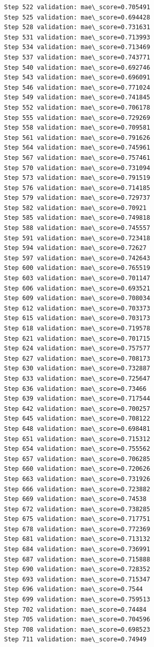\documentclass[11pt]{article}
\begin{document}
\begin{Verbatim}[commandchars=\\\{\}]
Step 522 validation: mae\_score=0.705491
Step 525 validation: mae\_score=0.694428
Step 528 validation: mae\_score=0.731631
Step 531 validation: mae\_score=0.713993
Step 534 validation: mae\_score=0.713469
Step 537 validation: mae\_score=0.743771
Step 540 validation: mae\_score=0.692746
Step 543 validation: mae\_score=0.696091
Step 546 validation: mae\_score=0.771024
Step 549 validation: mae\_score=0.741845
Step 552 validation: mae\_score=0.706178
Step 555 validation: mae\_score=0.729269
Step 558 validation: mae\_score=0.709581
Step 561 validation: mae\_score=0.791626
Step 564 validation: mae\_score=0.745961
Step 567 validation: mae\_score=0.757461
Step 570 validation: mae\_score=0.731094
Step 573 validation: mae\_score=0.791519
Step 576 validation: mae\_score=0.714185
Step 579 validation: mae\_score=0.729737
Step 582 validation: mae\_score=0.70921
Step 585 validation: mae\_score=0.749818
Step 588 validation: mae\_score=0.745557
Step 591 validation: mae\_score=0.723418
Step 594 validation: mae\_score=0.72627
Step 597 validation: mae\_score=0.742643
Step 600 validation: mae\_score=0.765519
Step 603 validation: mae\_score=0.701147
Step 606 validation: mae\_score=0.693521
Step 609 validation: mae\_score=0.708034
Step 612 validation: mae\_score=0.703373
Step 615 validation: mae\_score=0.703173
Step 618 validation: mae\_score=0.719578
Step 621 validation: mae\_score=0.701715
Step 624 validation: mae\_score=0.757577
Step 627 validation: mae\_score=0.708173
Step 630 validation: mae\_score=0.732887
Step 633 validation: mae\_score=0.725647
Step 636 validation: mae\_score=0.73466
Step 639 validation: mae\_score=0.717544
Step 642 validation: mae\_score=0.700257
Step 645 validation: mae\_score=0.708122
Step 648 validation: mae\_score=0.698481
Step 651 validation: mae\_score=0.715312
Step 654 validation: mae\_score=0.755562
Step 657 validation: mae\_score=0.706285
Step 660 validation: mae\_score=0.720626
Step 663 validation: mae\_score=0.731926
Step 666 validation: mae\_score=0.723882
Step 669 validation: mae\_score=0.74538
Step 672 validation: mae\_score=0.738285
Step 675 validation: mae\_score=0.717751
Step 678 validation: mae\_score=0.772369
Step 681 validation: mae\_score=0.713132
Step 684 validation: mae\_score=0.736991
Step 687 validation: mae\_score=0.715888
Step 690 validation: mae\_score=0.728352
Step 693 validation: mae\_score=0.715347
Step 696 validation: mae\_score=0.7544
Step 699 validation: mae\_score=0.759513
Step 702 validation: mae\_score=0.74484
Step 705 validation: mae\_score=0.704596
Step 708 validation: mae\_score=0.698523
Step 711 validation: mae\_score=0.74949

\end{Verbatim}
\end{document}
